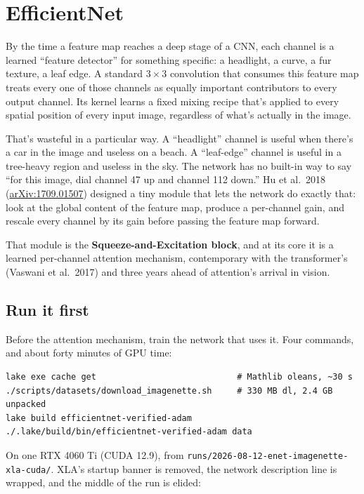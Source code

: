 \chapter{EfficientNet}
\label{chap:se}


By the time a feature map reaches a deep stage of a CNN, each
channel is a learned ``feature detector'' for something specific: a
headlight, a curve, a fur texture, a leaf edge. A standard
\(3 \times 3\) convolution that consumes this feature map treats
every one of those channels as equally important contributors to
every output channel. Its kernel learns a fixed mixing recipe
that's applied to every spatial position of every input image,
regardless of what's actually in the image.

That's wasteful in a particular way. A ``headlight'' channel is
useful when there's a car in the image and useless on a beach. A
``leaf-edge'' channel is useful in a tree-heavy region and useless
in the sky. The network has no built-in way to say ``for this
image, dial channel 47 up and channel 112 down.'' Hu et al.\ 2018
(\href{https://arxiv.org/abs/1709.01507}{arXiv:1709.01507})
designed a tiny module that lets the network do exactly that:
look at the global content of the feature map, produce a
per-channel gain, and rescale every channel by its gain before
passing the feature map forward.

That module is the \textbf{Squeeze-and-Excitation block}, and at
its core it is a learned per-channel attention mechanism, contemporary
with the transformer's (Vaswani et al.\ 2017) and three years ahead of
attention's arrival in vision.

\section{Run it first}
\label{sec:enet_runit}

Before the attention mechanism, train the network that uses it. Four
commands, and about forty minutes of GPU time:

\begin{verbatim}
lake exe cache get                            # Mathlib oleans, ~30 s
./scripts/datasets/download_imagenette.sh     # 330 MB dl, 2.4 GB unpacked
lake build efficientnet-verified-adam
./.lake/build/bin/efficientnet-verified-adam data
\end{verbatim}

On one RTX 4060 Ti (CUDA 12.9), from
\texttt{runs/2026-08-12-enet-imagenette-xla-cuda/}. XLA's startup banner
is removed, the network description line is wrapped, and the middle of
the run is elided:

